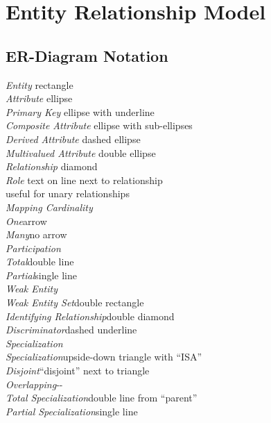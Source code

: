 \section{Entity Relationship Model}

\subsection*{ER-Diagram Notation}

\emph{Entity} \hfill rectangle\\
\emph{Attribute} \hfill ellipse\\
\ind\emph{Primary Key} \hfill ellipse with underline\\
\ind\emph{Composite Attribute} \hfill ellipse with sub-ellipses\\
\ind\emph{Derived Attribute} \hfill dashed ellipse\\
\ind\emph{Multivalued Attribute} \hfill double ellipse\\
\emph{Relationship} \hfill diamond\\
\ind\emph{Role} \hfill text on line next to relationship\\
\hfill useful for unary relationships\\
\emph{Mapping Cardinality} \hfill\\
\ind\emph{One}\hfill arrow\\
\ind\emph{Many}\hfill no arrow\\
\emph{Participation} \hfill\\
\ind\emph{Total}\hfill double line\\
\ind\emph{Partial}\hfill single line\\
\emph{Weak Entity}\hfill\\
\ind\emph{Weak Entity Set}\hfill double rectangle\\
\ind\emph{Identifying Relationship}\hfill double diamond\\
\ind\emph{Discriminator}\hfill dashed underline\\
\emph{Specialization}\hfill\\
\ind\emph{Specialization}\hfill upside-down triangle with ``ISA''\\
\ind\emph{Disjoint}\hfill ``disjoint'' next to triangle\\
\ind\emph{Overlapping}\hfill -{}-\\
\ind\emph{Total Specialization}\hfill double line from ``parent''\\
\ind\emph{Partial Specialization}\hfill single line\\

